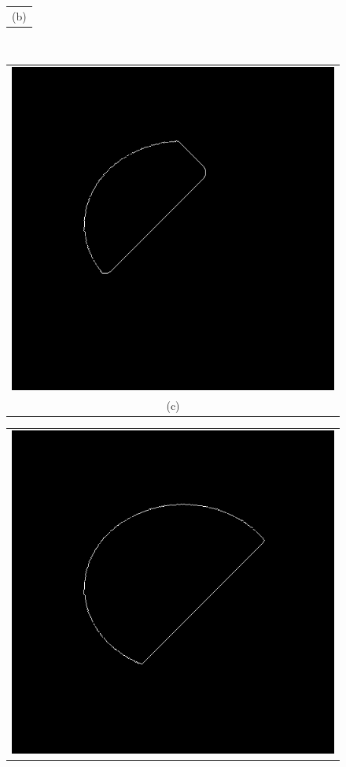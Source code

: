 \begin{figure}[h!]
\begin{minipage}{.49\textwidth}
\begin{tabular}{c}
(b)
\end{tabular}
\end{minipage}
\\
\begin{minipage}{.49\textwidth}
\begin{tabular}{c}
\includegraphics[width=.9\textwidth]{results/circleSeedPartlyOutside800} \\
(c)
\end{tabular}
\end{minipage}
\begin{minipage}{.49\textwidth}
\begin{tabular}{c}
\includegraphics[width=.9\textwidth]{results/circleSeedPartlyOutside1300} \\

\end{tabular}
\end{minipage}
\end{figure}
